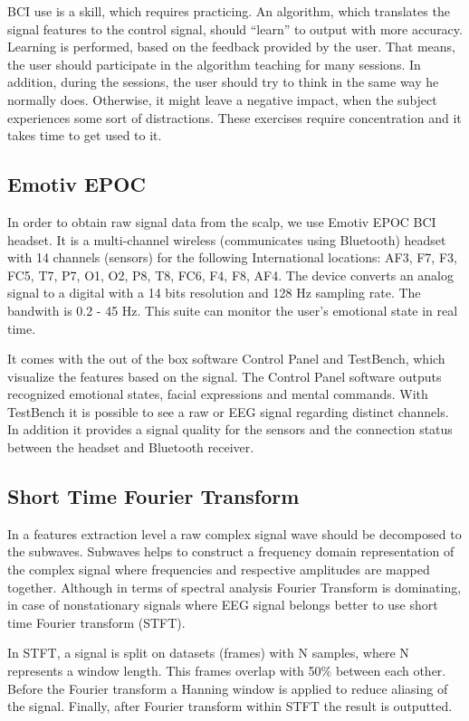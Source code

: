 \documentclass[12pt]{article}
\begin{document}
BCI use is a skill, which requires practicing. An algorithm, which translates the signal features to the control signal, should ``learn'' to output with more accuracy. Learning is performed, based on the feedback provided by the user. That means, the user should participate in the algorithm teaching for many sessions. In addition, during the sessions, the user should try to think in the same way he normally does. Otherwise, it might leave a negative impact, when the subject experiences some sort of distractions. These exercises require concentration and it takes time to get used to it.

\subsection{Emotiv EPOC}

In order to obtain raw signal data from the scalp, we use Emotiv EPOC BCI headset. It is a multi-channel wireless (communicates using Bluetooth) headset with 14 channels (sensors) for the following International locations: AF3, F7, F3, FC5, T7, P7, O1, O2, P8, T8, FC6, F4, F8, AF4. The device converts an analog signal to a digital with a 14 bits resolution and 128 Hz sampling rate. The bandwith is 0.2 - 45 Hz. This suite can monitor the user's emotional state in real time.\cite{emotiv}

It comes with the out of the box software Control Panel and TestBench, which visualize the features based on the signal. The Control Panel software outputs recognized emotional states, facial expressions and mental commands. With TestBench it is possible to see a raw or EEG signal regarding distinct channels. In addition it provides a signal quality for the sensors and the connection status between the headset and Bluetooth receiver.
\subsection{Short Time Fourier Transform}

In a features extraction level a raw complex signal wave should be decomposed to the subwaves. Subwaves helps to construct a frequency domain representation of the complex signal where frequencies and respective amplitudes are mapped together. Although in terms of spectral analysis Fourier Transform is dominating, in case of nonstationary signals where EEG signal belongs better to use short time Fourier transform (STFT).\cite{alfahoum_fft}

In STFT, a signal is split on datasets (frames) with N samples, where N represents a window length. This frames overlap with 50\% between each other. Before the Fourier transform a Hanning window is applied to reduce aliasing of the signal. Finally, after Fourier transform within STFT the result is outputted.
\end{document}
